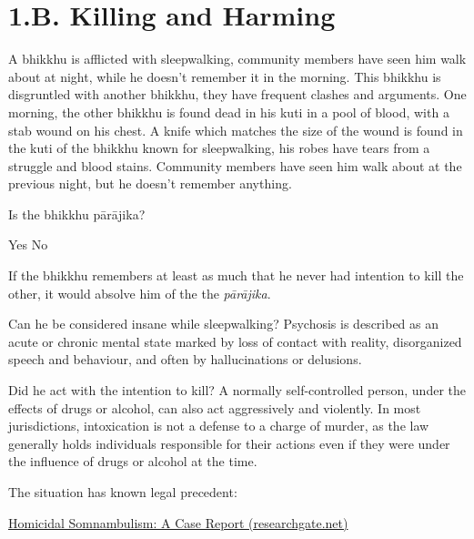 \chapter{1.B. Killing and Harming}
\renewcommand*{\theChapterTitle}{1.B. Killing and Harming}

\begin{exam}{\autoExamName}

\begin{problem}

  A bhikkhu is afflicted with sleepwalking, community members have seen him walk about at night, while he doesn't remember it in the morning.
  This bhikkhu is disgruntled with another bhikkhu, they have frequent clashes and arguments.
  One morning, the other bhikkhu is found dead in his kuti in a pool of blood, with a stab wound on his chest.
  A knife which matches the size of the wound is found in the kuti of the bhikkhu known for sleepwalking, his robes have tears from a struggle and blood stains.
  Community members have seen him walk about at the previous night, but he doesn't remember anything.

  \bigskip

  Is the bhikkhu pārājika?

  \bigskip

  \begin{answers}{2}
    \bChoices
     Yes\eAns
     No\eAns
    \eChoices
  \end{answers}

  \begin{solution}
    If the bhikkhu remembers at least as much that he never had intention to kill the other, it would absolve him of the the \emph{pārājika}.

    Can he be considered insane while sleepwalking? Psychosis is described as an acute or chronic mental state marked by loss of contact with reality, disorganized speech and behaviour, and often by hallucinations or delusions.

    Did he act with the intention to kill? A normally self-controlled person, under the effects of drugs or alcohol, can also act aggressively and violently. In most jurisdictions, intoxication is not a defense to a charge of murder, as the law generally holds individuals responsible for their actions even if they were under the influence of drugs or alcohol at the time.

    The situation has known legal precedent:

    \href{https://www.researchgate.net/publication/15260363_Homicidal_Somnambulism_A_Case_Report}{Homicidal Somnambulism: A Case Report (researchgate.net)}


\end{solution}
\end{problem}
\end{exam}
